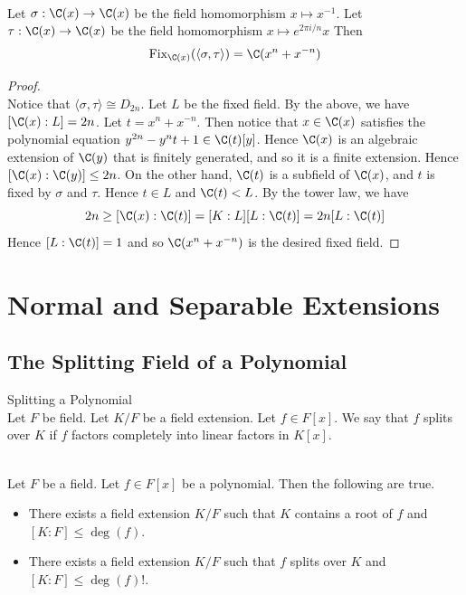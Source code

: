 \documentclass[a4paper]{article}
\begin{document}
\begin{eg}{}{}\\
Let $\sigma:\C(x)\to\C(x)$ be the field homomorphism $x\mapsto x^{-1}$. Let $\tau:\C(x)\to\C(x)$ be the field homomorphism $x\mapsto e^{2\pi i/n}x$ Then $$\text{Fix}_{\C(x)}(\langle\sigma,\tau\rangle)=\C(x^n+x^{-n})$$
\begin{proof}\\
Notice that $\langle\sigma,\tau\rangle\cong D_{2n}$. Let $L$ be the fixed field. By the above, we have $[\C(x):L]=2n$. Let $t=x^n+x^{-n}$. Then notice that $x\in\C(x)$ satisfies the polynomial equation $y^{2n}-y^nt+1\in\C(t)[y]$. Hence $\C(x)$ is an algebraic extension of $\C(y)$ that is finitely generated, and so it is a finite extension. Hence $[\C(x):\C(y)]\leq 2n$. On the other hand, $\C(t)$ is a subfield of $\C(x)$, and $t$ is fixed by $\sigma$ and $\tau$. Hence $t\in L$ and $\C(t)<L$. By the tower law, we have $$2n\geq [\C(x):\C(t)]=[K:L][L:\C(t)]=2n[L:\C(t)]$$ Hence $[L:\C(t)]=1$ and so $\C(x^n+x^{-n})$ is the desired fixed field. 
\end{proof}
\end{eg}

\pagebreak
\section{Normal and Separable Extensions}
\subsection{The Splitting Field of a Polynomial}
\begin{defn}{Splitting a Polynomial}{}\\
Let $F$ be field. Let $K/F$ be a field extension. Let $f\in F[x]$. We say that $f$ splits over $K$ if $f$ factors completely into linear factors in $K[x]$. 
\end{defn}

\begin{prp}{}{}\\
Let $F$ be a field. Let $f\in F[x]$ be a polynomial. Then the following are true. 
\begin{itemize}
\item There exists a field extension $K/F$ such that $K$ contains a root of $f$ and $[K:F]\leq\deg(f)$. 
\item There exists a field extension $K/F$ such that $f$ splits over $K$ and $[K:F]\leq\deg(f)!$. 
\end{itemize}
\end{prp}
\end{document}
